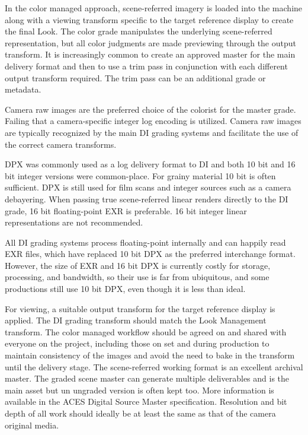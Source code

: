 In the color managed approach, scene-referred imagery is loaded into the machine along with a viewing transform specific to the target reference display to create the final Look. The color grade manipulates the underlying scene-referred representation, but all color judgments are made previewing through the output transform. It is increasingly common to create an approved master for the main delivery format and then to use a trim pass in conjunction with each different output transform required. The trim pass can be an additional grade or metadata.

Camera raw images are the preferred choice of the colorist for the master grade. Failing that a camera-specific integer log encoding is utilized. Camera raw images are typically recognized by the main DI grading systems and facilitate the use of the correct camera transforms.

DPX was commonly used as a log delivery format to DI and both 10 bit and 16 bit integer versions were common-place. For grainy material 10 bit is often sufficient. DPX is still used for film scans and integer sources such as a camera debayering. When passing true scene-referred linear renders directly to the DI grade, 16 bit floating-point EXR is preferable. 16 bit integer linear representations are not recommended.

All DI grading systems process floating-point internally and can happily read EXR files, which have replaced 10 bit DPX as the preferred interchange format. However, the size of EXR and 16 bit DPX is currently costly for storage, processing, and bandwidth, so their use is far from ubiquitous, and some productions still use 10 bit DPX, even though it is less than ideal. 

For viewing, a suitable output transform for the target reference display is applied. The DI grading transform should match the Look Management transform. The color managed workflow should be agreed on and shared with everyone on the project, including those on set and during production to maintain consistency of the images and avoid the need to bake in the transform until the delivery stage. The scene-referred working format is an excellent archival master. The graded scene master can generate multiple deliverables and is the main asset but un ungraded version is often kept too. More information is available in the ACES Digital Source Master specification. Resolution and bit depth of all work should ideally be at least the same as that of the camera original media.

